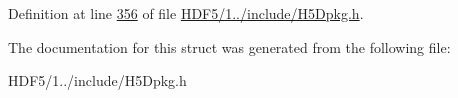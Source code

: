 Definition at line \hyperlink{_h_d_f5_21_810_81_2include_2_h5_dpkg_8h_source_l00356}{356} of file \hyperlink{_h_d_f5_21_810_81_2include_2_h5_dpkg_8h_source}{H\+D\+F5/1../include/\+H5\+Dpkg.\+h}.



The documentation for this struct was generated from the following file\+:\begin{DoxyCompactItemize}
\item 
H\+D\+F5/1../include/\+H5\+Dpkg.\+h\end{DoxyCompactItemize}
